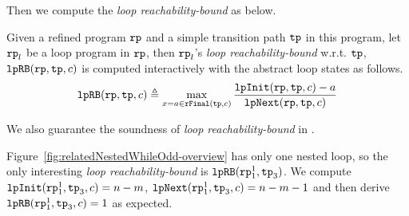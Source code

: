 %
Then we compute the
\emph{loop reachability-bound} as below.
\begin{defn}
 \label{def:looprb}
 Given a refined program $\mathtt{rp}$ and a simple transition path $\mathtt{tp}$ in this program, 
 let $\mathtt{rp}_l$ be a loop program in $\mathtt{rp}$,
 then $\mathtt{rp}_l$'s \emph{loop reachability-bound} w.r.t. $\mathtt{tp}$, $\mathtt{lpRB}(\mathtt{rp}, \mathtt{tp}, c)$
 is computed interactively with the abstract loop states as follows. 
 \[
 \mathtt{lpRB}(\mathtt{rp}, \mathtt{tp}, c) \triangleq
 \max\limits_{x = a \in \mathtt{rFinal}(\mathtt{tp}, c)}
 \frac{\mathtt{lpInit}(\mathtt{rp}, \mathtt{tp}, c) - a }{\mathtt{lpNext}(\mathtt{rp}, \mathtt{tp}, c)}
 \]
\end{defn}
%
We also guarantee the soundness of \emph{loop reachability-bound} in .
%


Figure~\ref{fig:relatedNestedWhileOdd-overview} has only one nested loop, so
the only interesting \emph{loop reachability-bound} is $\mathtt{lpRB}(\mathtt{rp}_1^1, \mathtt{tp}_3)$.
We compute $\mathtt{lpInit}(\mathtt{rp}_1^1, \mathtt{tp}_3, c) = n - m $, $\mathtt{lpNext}(\mathtt{rp}_1^1, \mathtt{tp}_3, c) = n - m - 1$ and then derive $\mathtt{lpRB}(\mathtt{rp}_1^1, \mathtt{tp}_3, c) = 1$ as expected.

